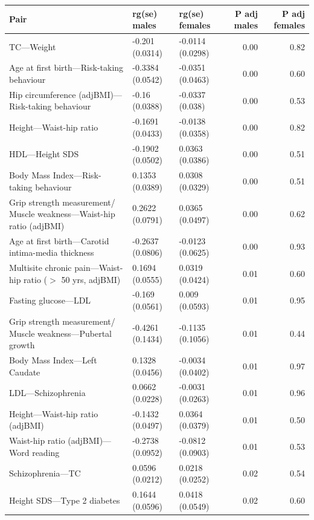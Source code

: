 \begin{table}[ht]
\centering
\begin{tabular}{lllrr}
  \hline
Pair & rg(se) males & rg(se) females & P adj males & P adj females \\ 
  \hline
TC---Weight & -0.201 (0.0314) & -0.0114 (0.0298) & 0.00 & 0.82 \\ 
  Age at first birth---Risk-taking behaviour & -0.3384 (0.0542) & -0.0351 (0.0463) & 0.00 & 0.60 \\ 
  Hip circumference (adjBMI)---Risk-taking behaviour & -0.16 (0.0388) & -0.0337 (0.038) & 0.00 & 0.53 \\ 
  Height---Waist-hip ratio & -0.1691 (0.0433) & -0.0138 (0.0358) & 0.00 & 0.82 \\ 
  HDL---Height SDS & -0.1902 (0.0502) & 0.0363 (0.0386) & 0.00 & 0.51 \\ 
  Body Mass Index---Risk-taking behaviour & 0.1353 (0.0389) & 0.0308 (0.0329) & 0.00 & 0.51 \\ 
  Grip strength measurement/ Muscle weakness---Waist-hip ratio (adjBMI) & 0.2622 (0.0791) & 0.0365 (0.0497) & 0.00 & 0.62 \\ 
  Age at first birth---Carotid intima-media thickness & -0.2637 (0.0806) & -0.0123 (0.0625) & 0.00 & 0.93 \\ 
  Multisite chronic pain---Waist-hip ratio ($>$ 50 yrs, adjBMI) & 0.1694 (0.0555) & 0.0319 (0.0424) & 0.01 & 0.60 \\ 
  Fasting glucose---LDL & -0.169 (0.0561) & 0.009 (0.0593) & 0.01 & 0.95 \\ 
  Grip strength measurement/ Muscle weakness---Pubertal growth & -0.4261 (0.1434) & -0.1135 (0.1056) & 0.01 & 0.44 \\ 
  Body Mass Index---Left Caudate & 0.1328 (0.0456) & -0.0034 (0.0402) & 0.01 & 0.97 \\ 
  LDL---Schizophrenia & 0.0662 (0.0228) & -0.0031 (0.0263) & 0.01 & 0.96 \\ 
  Height---Waist-hip ratio (adjBMI) & -0.1432 (0.0497) & 0.0364 (0.0379) & 0.01 & 0.50 \\ 
  Waist-hip ratio (adjBMI)---Word reading & -0.2738 (0.0952) & -0.0812 (0.0903) & 0.01 & 0.53 \\ 
  Schizophrenia---TC & 0.0596 (0.0212) & 0.0218 (0.0252) & 0.02 & 0.54 \\ 
  Height SDS---Type 2 diabetes & 0.1644 (0.0596) & 0.0418 (0.0549) & 0.02 & 0.60 \\ 

\end{tabular}
\end{table}
